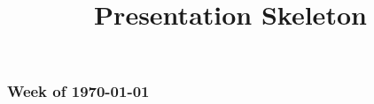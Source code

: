 \documentclass[10pt]{beamer}
\title{Presentation Skeleton}
\theoremstyle{definition}
\begin{document}
\begin{frame}
    \frametitle{Week of \today}
\end{frame}
\end{document}
